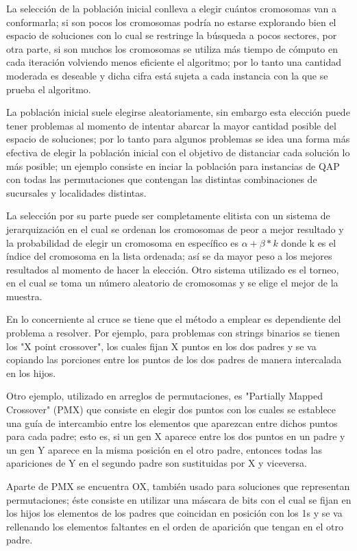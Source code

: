 \documentclass{ci5652}
\begin{document}
La selección de la población inicial conlleva a elegir cuántos cromosomas van a conformarla; si son pocos los cromosomas podría no estarse explorando bien el espacio de soluciones con lo cual se restringe la búsqueda a pocos sectores, por otra parte, si son muchos los cromosomas se utiliza más tiempo de cómputo en cada iteración volviendo menos eficiente el algoritmo; por lo tanto una cantidad moderada es deseable y dicha cifra está sujeta a cada instancia con la que se prueba el algoritmo. 

La población inicial suele elegirse aleatoriamente, sin embargo esta elección puede tener problemas al momento de intentar abarcar la mayor cantidad posible del espacio de soluciones; por lo tanto para algunos problemas se idea una forma más efectiva de elegir la población inicial con el objetivo de distanciar cada solución lo más posible; un ejemplo consiste en inciar la población para instancias de QAP con todas las permutaciones que contengan las distintas combinaciones de sucursales y localidades distintas.

La selección por su parte puede ser completamente elitista con un sistema de jerarquización en el cual se ordenan los cromosomas de peor a mejor resultado y la probabilidad de elegir un cromosoma en específico es $\alpha+\beta*k$ donde k es el índice del cromosoma en la lista ordenada; así se da mayor peso a los mejores resultados al momento de hacer la elección. Otro sistema utilizado es el torneo, en el cual se toma un número aleatorio de cromosomas y se elige el mejor de la muestra.

En lo concerniente al cruce se tiene que el método a emplear es dependiente del problema a resolver. Por ejemplo, para problemas con strings binarios se tienen los "X point crossover", los cuales fijan X puntos en los dos padres y se va copiando las porciones entre los puntos de los dos padres de manera intercalada en los hijos. 

Otro ejemplo, utilizado en arreglos de permutaciones, es "Partially Mapped Crossover" (PMX) que consiste en elegir dos puntos con los cuales se establece una guía de intercambio entre los elementos que aparezcan entre dichos puntos para cada padre; esto es, si un gen X aparece entre los dos puntos en un padre y un gen Y aparece en la misma posición en el otro padre, entonces todas las apariciones de Y en el segundo padre son sustituidas por X y viceversa.

Aparte de PMX se encuentra OX, también usado para soluciones que representan permutaciones; éste consiste en utilizar una máscara de bits con el cual se fijan en los hijos los elementos de los padres que coincidan en posición con los 1s y se va rellenando los elementos faltantes en el orden de aparición que tengan en el otro padre.
\end{document}
